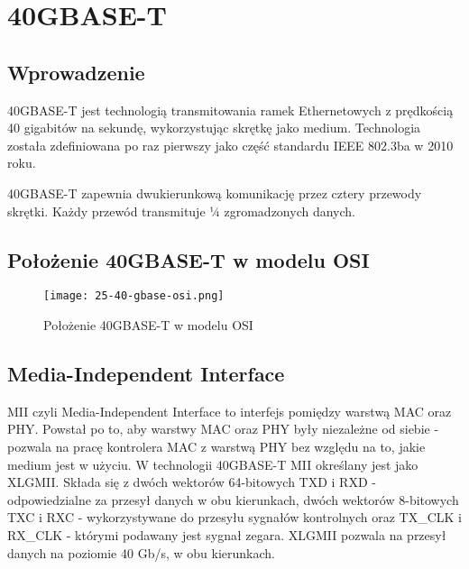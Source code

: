 \section{40GBASE-T}

\subsection{Wprowadzenie}
40GBASE-T jest technologią transmitowania ramek Ethernetowych z prędkością 40 gigabitów na sekundę, wykorzystując skrętkę jako medium. Technologia została zdefiniowana po raz pierwszy jako część standardu IEEE 802.3ba w 2010 roku.

40GBASE-T zapewnia dwukierunkową komunikację przez cztery przewody skrętki. Każdy przewód transmituje ¼ zgromadzonych danych.

\subsection{Położenie 40GBASE-T w modelu OSI}

\begin{figure}[ht]
    \centering
    \texttt{[image: 25-40-gbase-osi.png]}
    \caption{Położenie 40GBASE-T w modelu OSI}
    \label{fig:40gbase-t_osi}
\end{figure}

\subsection{Media-Independent Interface}
MII czyli Media-Independent Interface to interfejs pomiędzy warstwą MAC oraz PHY. Powstał po to, aby warstwy MAC oraz PHY były niezależne od siebie - pozwala na pracę kontrolera MAC z warstwą PHY bez względu na to, jakie medium jest w użyciu.
W technologii 40GBASE-T MII określany jest jako XLGMII. Składa się z dwóch wektorów 64-bitowych TXD i RXD - odpowiedzialne za przesył danych w obu kierunkach, dwóch wektorów 8-bitowych TXC i RXC - wykorzystywane do przesyłu sygnałów kontrolnych oraz TX\_CLK i RX\_CLK - którymi podawany jest sygnał zegara. XLGMII pozwala na przesył danych na poziomie 40 Gb/s, w obu kierunkach.

